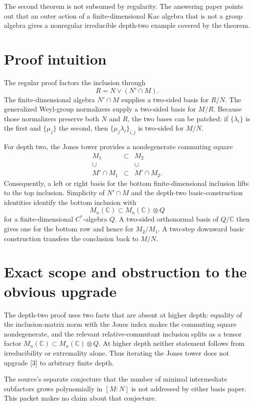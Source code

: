 \documentclass[11pt]{article}
\newcommand{\C}{\mathbb C}
\begin{document}
The second theorem is not subsumed by regularity.  The answering paper points
out that an outer action of a finite-dimensional Kac algebra that is not a
group algebra gives a nonregular irreducible depth-two example covered by the
theorem.

\section*{Proof intuition}
The regular proof factors the inclusion through
\[
 R=N\vee(N'\cap M).
\]
The finite-dimensional algebra $N'\cap M$ supplies a two-sided basis for
\(R/N\).  The generalized Weyl-group normalizers supply a two-sided basis for
\(M/R\).  Because those normalizers preserve both $N$ and $R$, the two
bases can be patched: if \(\{\lambda_i\}\) is the first and
\(\{\mu_j\}\) the second, then \(\{\mu_j\lambda_i\}_{i,j}\) is
two-sided for $M/N$.

For depth two, the Jones tower provides a nondegenerate commuting square
\[
\begin{matrix}
 M_1&\subset&M_2\\[-2pt]
 \cup&&\cup\\[-2pt]
 M'\cap M_1&\subset&M'\cap M_2.
\end{matrix}
\]
Consequently, a left or right basis for the bottom finite-dimensional
inclusion lifts to the top inclusion.  Simplicity of $N'\cap M$ and the
depth-two basic-construction identities identify the bottom inclusion with
\[
 M_n(\C)\subset M_n(\C)\otimes Q
\]
for a finite-dimensional $C^*$-algebra $Q$.  A two-sided orthonormal basis
of $Q/\C$ then gives one for the bottom row and hence for $M_2/M_1$.
A two-step downward basic construction transfers the conclusion back to
$M/N$.

\section*{Exact scope and obstruction to the obvious upgrade}
The depth-two proof uses two facts that are absent at higher depth: equality of
the inclusion-matrix norm with the Jones index makes the commuting square
nondegenerate, and the relevant relative-commutant inclusion splits as a
tensor factor $M_n(\C)\subset M_n(\C)\otimes Q$.  At higher depth neither
statement follows from irreducibility or extremality alone.  Thus iterating the
Jones tower does not upgrade [3] to arbitrary finite depth.

The source's separate conjecture that the number of minimal intermediate
subfactors grows polynomially in $[M:N]$ is not addressed by either basis
paper.  This packet makes no claim about that conjecture.
\end{document}
